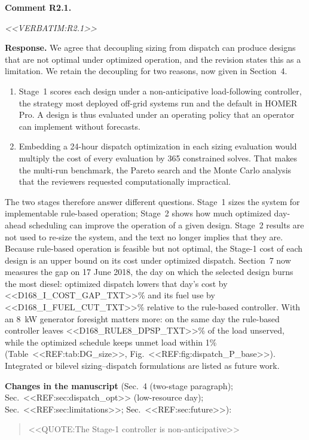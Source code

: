 \documentclass[11pt]{article}
\newcounter{rc}
\newcommand{\rcomment}[2]{\stepcounter{rc}\par\medskip
  \noindent\textbf{Comment #1.}\par
  {\color{commentgrey}\itshape #2\par}}
\newcommand{\response}[1]{\par\noindent\textbf{Response.} #1\par}
\newcommand{\change}[2]{\par\noindent\textbf{Changes in the manuscript} (#1):\par
  \begin{quote}\color{revblue}#2\end{quote}}
\begin{document}
\rcomment{R2.1}{<<VERBATIM:R2.1>>}
\response{We agree that decoupling sizing from dispatch can produce designs that are not optimal under optimized operation, and the revision states this as a limitation. We retain the decoupling for two reasons, now given in Section~4.
\begin{enumerate}[leftmargin=*,itemsep=1pt]
\item Stage~1 scores each design under a non-anticipative load-following controller, the strategy most deployed off-grid systems run and the default in HOMER Pro. A design is thus evaluated under an operating policy that an operator can implement without forecasts.
\item Embedding a 24-hour dispatch optimization in each sizing evaluation would multiply the cost of every evaluation by 365 constrained solves. That makes the multi-run benchmark, the Pareto search and the Monte Carlo analysis that the reviewers requested computationally impractical.
\end{enumerate}
The two stages therefore answer different questions. Stage~1 sizes the system for implementable rule-based operation; Stage~2 shows how much optimized day-ahead scheduling can improve the operation of a given design. Stage~2 results are not used to re-size the system, and the text no longer implies that they are. Because rule-based operation is feasible but not optimal, the Stage-1 cost of each design is an upper bound on its cost under optimized dispatch. Section~7 now measures the gap on 17 June 2018, the day on which the selected design burns the most diesel: optimized dispatch lowers that day's cost by <<D168_I_COST_GAP_TXT>>\% and its fuel use by <<D168_I_FUEL_CUT_TXT>>\% relative to the rule-based controller. With an 8~kW generator foresight matters more: on the same day the rule-based controller leaves <<D168_RULE8_DPSP_TXT>>\% of the load unserved, while the optimized schedule keeps unmet load within 1\% (Table~<<REF:tab:DG_size>>, Fig.~<<REF:fig:dispatch_P_base>>). Integrated or bilevel sizing--dispatch formulations are listed as future work.}
\change{Sec.~4 (two-stage paragraph); Sec.~<<REF:sec:dispatch_opt>> (low-resource day); Sec.~<<REF:sec:limitations>>; Sec.~<<REF:sec:future>>}{<<QUOTE:The Stage-1 controller is non-anticipative>>}
\end{document}
